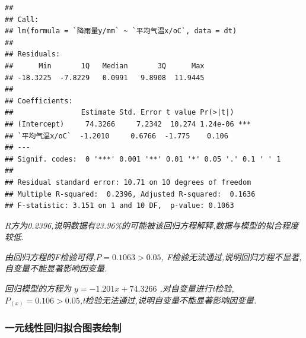 \documentclass[
]{article}
\begin{document}
\begin{verbatim}
## 
## Call:
## lm(formula = `降雨量y/mm` ~ `平均气温x/oC`, data = dt)
## 
## Residuals:
##      Min       1Q   Median       3Q      Max 
## -18.3225  -7.8229   0.0991   9.8908  11.9445 
## 
## Coefficients:
##                Estimate Std. Error t value Pr(>|t|)    
## (Intercept)     74.3266     7.2342  10.274 1.24e-06 ***
## `平均气温x/oC`  -1.2010     0.6766  -1.775    0.106    
## ---
## Signif. codes:  0 '***' 0.001 '**' 0.01 '*' 0.05 '.' 0.1 ' ' 1
## 
## Residual standard error: 10.71 on 10 degrees of freedom
## Multiple R-squared:  0.2396, Adjusted R-squared:  0.1636 
## F-statistic: 3.151 on 1 and 10 DF,  p-value: 0.1063
\end{verbatim}

\emph{R方为0.2396,说明数据有23.96\%的可能被该回归方程解释,数据与模型的拟合程度较低.}

\emph{由回归方程的F检验可得,\(P = 0.1063 > 0.05\),
F检验无法通过,说明回归方程不显著,自变量不能显著影响因变量.}

\emph{回归模型的方程为 \(y = -1.201x + 74.3266\)
,对自变量进行t检验,\(P_{(x)} = 0.106 > 0.05\),t检验无法通过,说明自变量不能显著影响因变量.}

\subsubsection{一元线性回归拟合图表绘制}\label{ux4e00ux5143ux7ebfux6027ux56deux5f52ux62dfux5408ux56feux8868ux7ed8ux5236}
\end{document}
